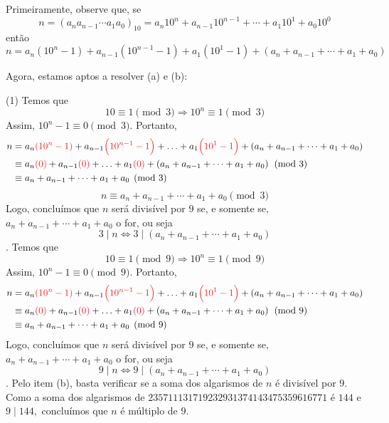 \documentclass[12pt, a4paper]{article}
\newcommand{\negrito}[1]{\mbox{\boldmath{$#1$}}}
\newcommand{\itens}[1]{\begin{tasks}[label={(tsk[a])},label-width=3.6ex, label-format = {\bfseries}, column-sep = {0pt}](1) #1\end{tasks}}
\newcommand{\alt}[1]{\textcolor{Floresta}{$\negrito{(#1)} $}}
\begin{document}
\begin{solution}
Primeiramente, observe que, se 
$$ n= \left( a_{n}a_{n-1} \cdots a_{1}a_{0} \right) _{10}=a_{n}10^{n}+a_{n-1}10^{n-1}+ \cdots +a_{1}10^{1}+a_{0}10^{0} $$ 
então
 $$ n=a_{n} \left( 10^{n}-1 \right) +a_{n-1} \left( 10^{n-1}-1 \right) +a_{1} \left( 10^{1}-1 \right) + \left( a_{n}+a_{n-1}+ \cdots +a_{1}+a_{0} \right)  $$ 

Agora, estamos aptos a resolver (a) e (b):
\itens{
 \task[\alt{a}] Temos que
 $$ 10 \equiv 1 \pmod 3 \Rightarrow 10^{n} \equiv 1  \pmod 3 $$ 
 Assim, $10^{n}-1 \equiv 0 \pmod{3}.$ Portanto,
 \begin{align*}
 n&=a_{n} \textcolor{Red}{\left( 10^{n}-1 \right)} +a_{n-1} \textcolor{Red}{\left( 10^{n-1}-1 \right)}+ \ldots  +a_{1} \textcolor{Red}{\left( 10^{1}-1 \right)} + \left( a_{n}+a_{n-1}+ \cdots +a_{1}+a_{0} \right) \\&\equiv a_{n} \textcolor{Red}{(0)} +a_{n-1} \textcolor{Red}{(0)} + \ldots  +a_{1} \textcolor{Red}{(0)}  + \left( a_{n}+a_{n-1}+ \cdots +a_{1}+a_{0} \right) \pmod{3} \\&\equiv a_{n}+a_{n-1}+ \cdots +a_{1}+a_{0} \pmod{3}
\end{align*}
 \[
 n \equiv a_{n}+a_{n-1}+ \cdots +a_{1}+a_{0} \pmod{3}
 \]
 Logo, concluímos que $n$ será divisível por $9$ se, e somente se, $a_{n}+a_{n-1}+ \cdots +a_{1}+a_{0} $ o for, ou seja
  $$ 3\mid n \Leftrightarrow 3\mid \left( a_{n}+a_{n-1}+ \cdots +a_{1}+a_{0} \right)$$.
  \task[\alt{b}] Temos que
 $$ 10 \equiv 1 \pmod 9 \Rightarrow 10^{n} \equiv 1  \pmod 9 $$ 
 Assim, $10^{n}-1 \equiv 0 \pmod{9}.$ Portanto,
 \begin{align*}
 n&=a_{n} \textcolor{Red}{\left( 10^{n}-1 \right)} +a_{n-1} \textcolor{Red}{\left( 10^{n-1}-1 \right)}+ \ldots  +a_{1} \textcolor{Red}{\left( 10^{1}-1 \right)} + \left( a_{n}+a_{n-1}+ \cdots +a_{1}+a_{0} \right) \\&\equiv a_{n} \textcolor{Red}{(0)} +a_{n-1} \textcolor{Red}{(0)} + \ldots  +a_{1} \textcolor{Red}{(0)}  + \left( a_{n}+a_{n-1}+ \cdots +a_{1}+a_{0} \right) \pmod{9} \\&\equiv a_{n}+a_{n-1}+ \cdots +a_{1}+a_{0} \pmod{9}
\end{align*}
 Logo, concluímos que $n$ será divisível por $9$ se, e somente se, $a_{n}+a_{n-1}+ \cdots +a_{1}+a_{0} $ o for, ou seja
  $$ 9\mid n \Leftrightarrow 9\mid \left( a_{n}+a_{n-1}+ \cdots +a_{1}+a_{0} \right)$$.
  \task[\alt{c}] Pelo item (b), basta verificar se a soma dos algarismos de $n$ é divisível por $9.$ Como a soma dos algarismos de $235711131719232931374143475359616771$ é $144$ e $9 \mid 144,$ concluímos que $n$ é múltiplo de $9.$
 }
\end{solution}
\end{document}
